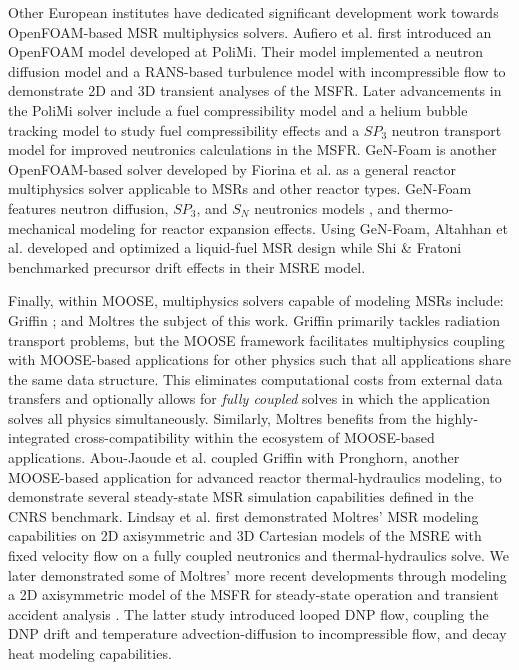 Other European institutes have dedicated significant development work towards
OpenFOAM-based \gls{MSR} multiphysics solvers. Aufiero et al.
\cite{aufiero_development_2014} first introduced an OpenFOAM model developed
at \gls{PoliMi}. Their model implemented a neutron diffusion model and a
\gls{RANS}-based turbulence model with incompressible flow to demonstrate 2D
and 3D transient analyses of the \gls{MSFR}. Later advancements in the
\gls{PoliMi} solver include a fuel compressibility model and a helium bubble
tracking model to study fuel compressibility effects
\cite{cervi_development_2019} and a $SP_3$ neutron transport
model for improved neutronics calculations \cite{cervi_development_2019-1} in
the \gls{MSFR}. GeN-Foam is another OpenFOAM-based solver developed by Fiorina
et al. \cite{fiorina_gen-foam_2015} as a general reactor multiphysics solver
applicable to \glspl{MSR} and other reactor types. GeN-Foam features neutron
diffusion, $SP_3$, and $S_N$ neutronics models 
\cite{fiorina_development_2016,fiorina_gen-foam_2015,fiorina_detailed_2019},
and thermo-mechanical modeling for reactor expansion effects. Using GeN-Foam,
Altahhan et al. \cite{altahhan_preliminary_2020} developed and optimized a
liquid-fuel \gls{MSR} design while Shi \& Fratoni \cite{shi_gen-foam_2021}
benchmarked precursor drift effects in their \gls{MSRE} model.

Finally, within MOOSE, multiphysics solvers capable of modeling
\glspl{MSR} include: Griffin \cite{wang_rattlesnake_2021}; and Moltres
\cite{lindsay_moltres_2017}\textemdash the subject of this work.
Griffin primarily tackles radiation transport problems, but the MOOSE
framework facilitates multiphysics coupling
with MOOSE-based applications for other physics
such that all applications share the same data structure. This eliminates
computational costs from external data transfers and optionally allows for
\textit{fully coupled} solves in which the application solves all physics
simultaneously. Similarly, Moltres benefits from the highly-integrated
cross-compatibility
within the ecosystem of MOOSE-based applications. Abou-Jaoude et al.
\cite{abou-jaoude_coupled_2020} coupled Griffin with Pronghorn, another
MOOSE-based application for advanced reactor thermal-hydraulics modeling, to
demonstrate several steady-state \gls{MSR} simulation capabilities defined in
the CNRS benchmark. Lindsay et al.
\cite{lindsay_introduction_2018} first demonstrated Moltres' \gls{MSR} modeling
capabilities on 2D axisymmetric and 3D Cartesian models of the \gls{MSRE} with
fixed velocity flow on a fully coupled neutronics and thermal-hydraulics solve.
We later demonstrated some of Moltres' more recent developments through
modeling a 2D axisymmetric model of the \gls{MSFR} for steady-state operation
and transient accident analysis \cite{park_advancement_2020}. The latter study
introduced looped \gls{DNP} flow, coupling the \gls{DNP} drift and temperature 
advection-diffusion to incompressible flow, and decay heat modeling
capabilities.

